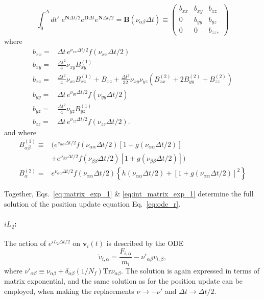 \documentclass[12pt,letter]{article}
\renewcommand{\vec}[1]{\mathbf{#1}}
\begin{document}
\begin{equation}
\int_0^\Delta d t'\, \, e^{\vec N \Delta t/2} e^{\vec D \Delta t} e^{\vec N \Delta t/2} = \vec B(\nu_{\alpha \beta}\Delta t) \equiv
\left(
\begin{matrix}
b_{xx} & b_{xy} &b_{xz} \\
0 & b_{yy} & b_{yz} \\
0 & 0 & b_{zz},\label{eq:int_matrix_exp_1}
\end{matrix}\right)
\end{equation}
where
\begin{equation}
\begin{aligned}
b_{xx} =& \Delta t\, e^{\nu_{xx} \Delta t/2} f(\nu_{xx}\Delta t/2)\\
b_{xy} =&\frac{\Delta t^2}4\nu_{xy} B^{(1)}_{xy}\\
b_{xz} =& \frac{\Delta t^2}4\nu_{xz} B^{(1)}_{xz} + B_{xz} + \frac{\Delta t^2}{32} \nu_{xy}\nu_{yz} (B^{(2)}_{xx} +2 B^{(2)}_{yy} + B^{(2)}_{zz})\\
b_{yy} =&\Delta t\, e^{\nu_{yy} \Delta t/2} f(\nu_{yy}\Delta t/2)\\
b_{yz} =& \frac{\Delta t^2}4 \nu_{yz} B^{(1)}_{yz}\\
b_{zz} =& \Delta t\,e^{\nu_{zz} \Delta t/2} f(\nu_{zz}\Delta t/2).
\end{aligned}\label{eq:matrix_exp_2}
\end{equation}
and where
\begin{equation}\begin{aligned}
B^{(1)}_{\alpha\beta}\equiv& \Big(e^{\nu_{\alpha\alpha} \Delta t/2} f(\nu_{\alpha\alpha}\Delta t/2)[1+g(\nu_{\alpha\alpha}\Delta t/2)]\\
& + e^{\nu_{\beta\beta} \Delta t/2} f(\nu_{\beta\beta}\Delta t/2)[1+ g(\nu_{\beta\beta}\Delta t/2)]\Big)\\
B^{(2)}_{\alpha} =& e^{\nu_{\alpha\alpha} \Delta t/2} f(\nu_{\alpha\alpha}\Delta t/2) \left\{h(\nu_{\alpha\alpha}\Delta t/2) + [1+g(\nu_{\alpha\alpha}\Delta t/2)]^2\right\}
\end{aligned}\end{equation}

Together, Eqs.~\eqref{eq:matrix_exp_1} \& \eqref{eq:int_matrix_exp_1} determine the full solution
of the position update equation Eq.~\eqref{eq:ode_r}.

\paragraph{$iL_2$:} The action of $e^{i L_2 \Delta t/2}$ on $\vec v_i(t)$
is described by the ODE
\begin{equation}
\dot v_{i,\alpha} = \frac{F_{i,\alpha}}{m_i} - \nu'_{\alpha\beta} v_{i,\beta},
\label{eq:odev}
\end{equation}
where $\nu'_{\alpha\beta} \equiv \nu_{\alpha\beta} + \delta_{\alpha\beta}
(1/N_f) \mathrm{Tr} \nu_{\alpha\beta}$.
The solution is again expressed in terms of matrix exponential, and the same solution
as for the position update can be employed, when making the replacements $\nu \to -\nu'$
and $\Delta t \to \Delta t/2$.
\end{document}
